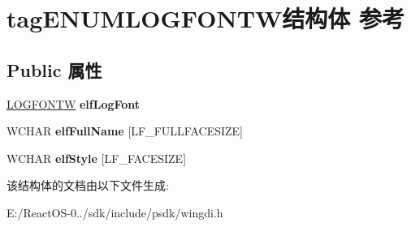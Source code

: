 \hypertarget{structtag_e_n_u_m_l_o_g_f_o_n_t_w}{}\section{tag\+E\+N\+U\+M\+L\+O\+G\+F\+O\+N\+T\+W结构体 参考}
\label{structtag_e_n_u_m_l_o_g_f_o_n_t_w}
\subsection*{Public 属性}
\begin{DoxyCompactItemize}
\item 
\mbox{\label{structtag_e_n_u_m_l_o_g_f_o_n_t_w_a1a4b26633f34ae56111e48dacd709d70}} 
\hyperlink{struct_l_o_g_f_o_n_t_w}{L\+O\+G\+F\+O\+N\+TW} {\bfseries elf\+Log\+Font}
\item 
\mbox{\label{structtag_e_n_u_m_l_o_g_f_o_n_t_w_a3a10563b9288bdd87244c2da2a151ec0}} 
W\+C\+H\+AR {\bfseries elf\+Full\+Name} \mbox{[}L\+F\+\_\+\+F\+U\+L\+L\+F\+A\+C\+E\+S\+I\+ZE\mbox{]}
\item 
\mbox{\label{structtag_e_n_u_m_l_o_g_f_o_n_t_w_aaf104d92d9786420e70f9b87bc4b243a}} 
W\+C\+H\+AR {\bfseries elf\+Style} \mbox{[}L\+F\+\_\+\+F\+A\+C\+E\+S\+I\+ZE\mbox{]}
\end{DoxyCompactItemize}


该结构体的文档由以下文件生成\+:\begin{DoxyCompactItemize}
\item 
E\+:/\+React\+O\+S-\/0../sdk/include/psdk/wingdi.\+h\end{DoxyCompactItemize}
